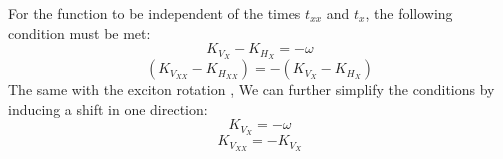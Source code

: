 For the function to be independent of the times $t_{xx}$ and $t_{x}$, the following condition must be met:
\begin{equation}
	K_{V_X}-K_{H_X} = -\omega
\end{equation}
\begin{equation}
	(K_{V_{XX}} -K_{H_{XX}}) = -(K_{V_X}-K_{H_X})
\end{equation}
The same with the exciton rotation , We can further simplify the conditions by inducing a shift in one direction:
\begin{equation}
	K_{V_X} = -\omega
\end{equation}
\begin{equation}
	K_{V_{XX}} = -K_{V_X}
\end{equation}